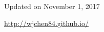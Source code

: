 \documentclass[UTF8,nofonts]{res}
\begin{document}
\begin{resume}
%

\vspace{0.3in}
\centerline{\footnotesize Updated on November 1, 2017}
\centerline{\footnotesize \url{http://wjchen84.github.io/}}

\end{resume}
\end{document}
